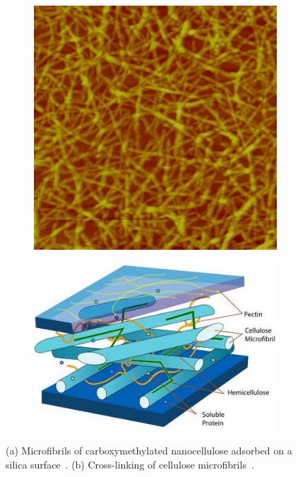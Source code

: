 \begin{figure}
\centering

\begin{subfigure}{.49\linewidth}
  \centering
  \includegraphics[width=.8\linewidth]{img/AFM_Innventia_nanocellulose}
  \caption{}
  \label{fig:cellulose}
\end{subfigure}
\begin{subfigure}{.49\linewidth}
  \centering
  \includegraphics[width=\linewidth]{img/crosslink}
  \caption{}
  \label{fig:crosslink}
\end{subfigure}%
\caption{(a) Microfibrils of carboxymethylated nanocellulose adsorbed on a silica surface~\cite{xxx}. (b) Cross-linking of cellulose microfibrils~\cite{xxx}.} 
\end{figure}







